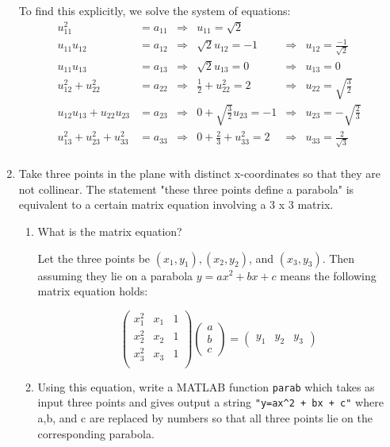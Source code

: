 \documentclass[12pt]{amsart}
\begin{document}
\begin{enumerate}
To find this explicitly, we solve the system of equations:
 \begin{align*}
u_{11}^2 & =  a_{11} & \Rightarrow & u_{11}  =  \sqrt{2} \\
u_{11}u_{12} & =  a_{12}  & \Rightarrow & \sqrt{2} u_{12} =  -1 & \Rightarrow &  u_{12} = \frac{-1}{\sqrt{2}} \\
u_{11}u_{13} & =  a_{13}  & \Rightarrow & \sqrt{2} u_{13} =  0 & \Rightarrow & u_{13} = 0 \\
u_{12}^2 + u_{22}^2 & =  a_{22}  & \Rightarrow & \frac{1}{2} +  u_{22}^2 =  2 & \Rightarrow& u_{22} = \sqrt{\frac{3}{2}} \\
u_{12} u_{13} + u_{22} u_{23} & =  a_{23} & \Rightarrow & 0 + \sqrt{\frac{3}{2}} u_{23}  = -1 & \Rightarrow & u_{23} = - \sqrt{\frac{2}{3}} \\
u_{13}^2 + u_{23}^2 + u_{33}^2 & =  a_{33} & \Rightarrow & 0 + \frac{2}{3} + u_{33}^2 = 2 & \Rightarrow & u_{33} = \frac{2}{\sqrt{3}}\\
\end{align*}


\vfill
\pagebreak 


\item Take three points in the plane with distinct x-coordinates 
so that they are not collinear. The statement "these three 
points define a parabola" is equivalent to a certain matrix 
equation involving a 3 x 3 matrix.

\begin{enumerate}
\item What is the matrix equation?

Let the three points be $(x_1,y_1),(x_2,y_2)$, and $(x_3,y_3)$.
Then assuming they lie on a parabola $y = ax^2 + bx + c$ means 
the following matrix equation holds:

\[ \left( \begin{array}{ccc}
x_1^2 & x_1 & 1 \\
x_2^2 & x_2 & 1 \\
x_3^2 & x_3 & 1 \\
\end{array}\right) \left( \begin{array}{c}
a \\ b \\ c \end{array} \right)
= \left( \begin{array}{c} y_1 & y_2 & y_3
\end{array} \right) \]

\item  Using this equation, write a MATLAB 
function {\tt parab} which takes as input 
three points and gives output a string 
{\tt "y=ax\^{}2 + bx + c"} where a,b, and c 
are replaced by numbers so that all three points 
lie on the corresponding parabola.



\end{enumerate}
\end{enumerate}
\end{document}
